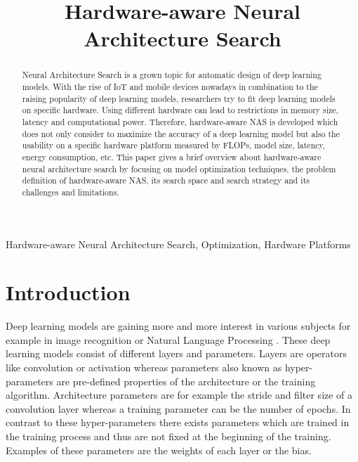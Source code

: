 \documentclass[conference]{IEEEtran}
\begin{document}
\title{Hardware-aware Neural Architecture Search\\}

\author{
}

\maketitle

\begin{abstract}
Neural Architecture Search is a grown topic for automatic design of deep learning models. With the rise of IoT and mobile devices nowadays in combination to the raising popularity of deep learning models, researchers try to fit deep learning models on specific hardware. Using different hardware can lead to restrictions in memory size, latency and computational power. Therefore, hardware-aware NAS is developed which does not only consider to maximize the accuracy of a deep learning model but also the usability on a specific hardware platform measured by FLOPs, model size, latency, energy consumption, etc. This paper gives a brief overview about hardware-aware neural architecture search by focusing on model optimization techniques, the problem definition of hardware-aware NAS, its search space and search strategy and its challenges and limitations.  
\end{abstract}

\begin{IEEEkeywords}
Hardware-aware Neural Architecture Search, Optimization, Hardware Platforms
\end{IEEEkeywords}

\section{Introduction}
\label{section:Introduction}
Deep learning models are gaining more and more interest in various subjects for example in image recognition \cite{bib2} or Natural Language Processing \cite{bib3}. These deep learning models consist of different layers and parameters. Layers are operators like convolution or activation whereas parameters also known as hyper-parameters are pre-defined properties of the architecture or the training algorithm. Architecture parameters are for example the stride and filter size of a convolution layer whereas a training parameter can be the number of epochs. In contrast to these hyper-parameters there exists parameters which are trained in the training process and thus are not fixed at the beginning of the training. Examples of these parameters are the weights of each layer or the bias. 
\end{document}
